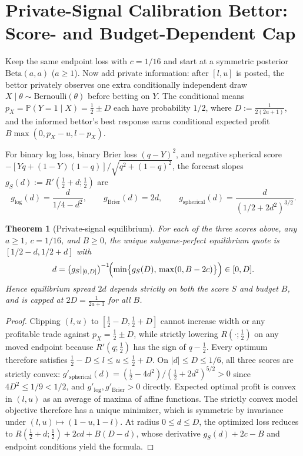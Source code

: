 \documentclass[11pt]{article}
\theoremstyle{plain}
\newtheorem{theorem}{Theorem}
\theoremstyle{definition}
\theoremstyle{remark}
\begin{document}
\section{Private-Signal Calibration Bettor: Score- and Budget-Dependent Cap}

Keep the same endpoint loss with $c = 1/16$ and start at a symmetric posterior $\mathrm{Beta}(a, a)$ ($a \ge 1$). Now add private information: after $[l, u]$ is posted, the bettor privately observes one extra conditionally independent draw $X \mid \theta \sim \mathrm{Bernoulli}(\theta)$ before betting on $Y$. The conditional means $p_X = \mathbb{P}(Y = 1 \mid X) = \frac{1}{2} \pm D$ each have probability $1/2$, where $D := \frac{1}{2(2a + 1)}$, and the informed bettor's best response earns conditional expected profit $B\max(0, p_X - u, l - p_X)$.

For binary log loss, binary Brier loss $(q - Y)^2$, and negative spherical score $-[Yq + (1-Y)(1-q)]/\sqrt{q^2+(1-q)^2}$, the forecast slopes $g_S(d) := R'(\frac{1}{2} + d; \frac{1}{2})$ are
\[
g_{\mathrm{log}}(d) = \frac{d}{1/4 - d^2}, \qquad
g_{\mathrm{Brier}}(d) = 2d, \qquad
g_{\mathrm{spherical}}(d) = \frac{d}{(1/2 + 2d^2)^{3/2}}.
\]

\begin{theorem}[Private-signal equilibrium]\label{thm:informed}
For each of the three scores above, any $a \ge 1$, $c = 1/16$, and $B \ge 0$, the unique subgame-perfect equilibrium quote is $[1/2 - d, 1/2 + d]$ with
\[
d = \bigl(g_S|_{[0, D]}\bigr)^{-1}\!\Bigl(\min\bigl\{g_S(D),\, \max(0, B - 2c)\bigr\}\Bigr) \in [0, D].
\]
Hence equilibrium spread $2d$ depends strictly on both the score $S$ and budget $B$, and is capped at $2D = \frac{1}{2a + 1}$ for all $B$.
\end{theorem}

\begin{proof}
Clipping $(l, u)$ to $[\frac{1}{2} - D, \frac{1}{2} + D]$ cannot increase width or any profitable trade against $p_X = \frac{1}{2} \pm D$, while strictly lowering $R(\cdot; \frac{1}{2})$ on any moved endpoint because $R'(q; \frac{1}{2})$ has the sign of $q - \frac{1}{2}$. Every optimum therefore satisfies $\frac{1}{2} - D \le l \le u \le \frac{1}{2} + D$. On $|d| \le D \le 1/6$, all three scores are strictly convex: $g'_{\mathrm{spherical}}(d) = (\frac{1}{2} - 4d^2)/(\frac{1}{2} + 2d^2)^{5/2} > 0$ since $4D^2 \le 1/9 < 1/2$, and $g'_{\mathrm{log}}, g'_{\mathrm{Brier}} > 0$ directly. Expected optimal profit is convex in $(l, u)$ as an average of maxima of affine functions. The strictly convex model objective therefore has a unique minimizer, which is symmetric by invariance under $(l, u) \mapsto (1 - u, 1 - l)$. At radius $0 \le d \le D$, the optimized loss reduces to $R(\frac{1}{2} + d; \frac{1}{2}) + 2cd + B(D - d)$, whose derivative $g_S(d) + 2c - B$ and endpoint conditions yield the formula.
\end{proof}
\end{document}
